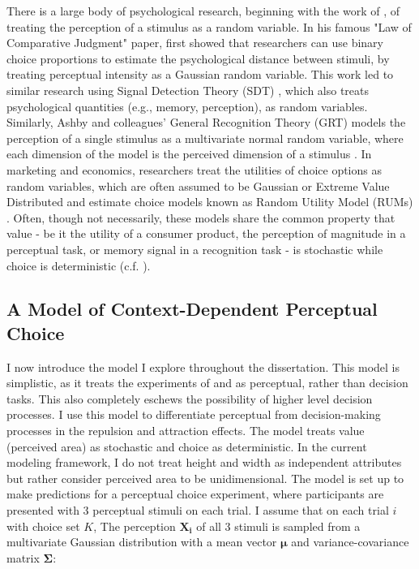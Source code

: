There is a large body of psychological research, beginning with the work of \textcite{thurstone1927law}, of treating the perception of a stimulus as a random variable. In his famous "Law of Comparative Judgment" paper, \textcite{thurstone1927law} first showed that researchers can use binary choice proportions to estimate the psychological distance between stimuli, by treating perceptual intensity as a Gaussian random variable. This work led to similar research using Signal Detection Theory (SDT) \parencite{hautus2021detection}, which also treats psychological quantities (e.g., memory, perception), as random variables. Similarly, Ashby and colleagues' General Recognition Theory (GRT) models the perception of a single stimulus as a multivariate normal random variable, where each dimension of the model is the perceived dimension of a stimulus \parencite{ashbyVarietiesPerceptualIndependence1986a,ashby1988decision, ashbyUnifiedTheorySimilarity}. In marketing and economics, researchers treat the utilities of choice options as random variables, which are often assumed to be Gaussian or Extreme Value Distributed and estimate choice models known as Random Utility Model (RUMs) \parencite{mcfadden2001economic,hausman1978conditional,train2009discrete}. Often, though not necessarily, these models share the common property that value - be it the utility of a consumer product, the perception of magnitude in a perceptual task, or memory signal in a recognition task - is stochastic while choice is deterministic  (c.f. \textcite{benjamin2009signal}).

\subsection{A Model of Context-Dependent Perceptual Choice}

I now introduce the model I explore throughout the dissertation.  This model is simplistic, as it treats the experiments of \textcite{trueblood2013not} and \textcite{spektorWhenGoodLooks2018b} as perceptual, rather than decision tasks. This also completely eschews the possibility of higher level decision processes. I use this model to differentiate perceptual from decision-making processes in the repulsion and attraction effects. The model treats value (perceived area) as stochastic and choice as deterministic. In the current modeling framework, I do not treat height and width as independent attributes but rather consider perceived area to be unidimensional. The model is set up to make predictions for a perceptual choice experiment, where participants are presented with 3 perceptual stimuli on each trial. I assume that on each trial $i$ with choice set $K$, The perception $\mathbf{X_i}$ of all 3 stimuli is sampled from a multivariate Gaussian distribution with a mean vector $\boldsymbol{\mu}$ and variance-covariance matrix $\boldsymbol{\Sigma}$:

